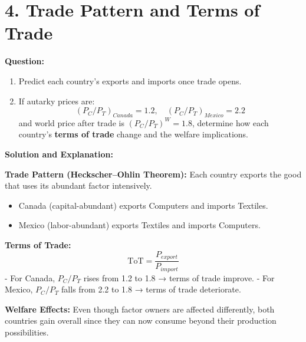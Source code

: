 \documentclass[12pt]{article}
\begin{document}
\section*{4. Trade Pattern and Terms of Trade}

\noindent\textbf{Question:}
\begin{enumerate}
    \item Predict each country’s exports and imports once trade opens.
    \item If autarky prices are:
    \[
    (P_C/P_T)_{Canada} = 1.2, \quad (P_C/P_T)_{Mexico} = 2.2
    \]
    and world price after trade is \( (P_C/P_T)^W = 1.8 \), determine how each country’s \textbf{terms of trade} change and the welfare implications.
\end{enumerate}

\noindent\textbf{Solution and Explanation:}

\textbf{Trade Pattern (Heckscher–Ohlin Theorem):}  
Each country exports the good that uses its abundant factor intensively.
\begin{itemize}
    \item Canada (capital-abundant) exports Computers and imports Textiles.
    \item Mexico (labor-abundant) exports Textiles and imports Computers.
\end{itemize}

\textbf{Terms of Trade:}  
\[
\text{ToT} = \frac{P_{export}}{P_{import}}
\]
- For Canada, \(P_C/P_T\) rises from 1.2 to 1.8 → terms of trade improve.  
- For Mexico, \(P_C/P_T\) falls from 2.2 to 1.8 → terms of trade deteriorate.  

\textbf{Welfare Effects:}  
Even though factor owners are affected differently, both countries gain overall since they can now consume beyond their production possibilities.
\end{document}
